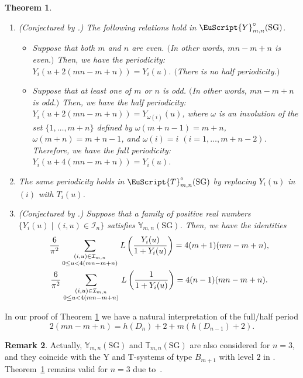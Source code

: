 \documentclass[pdftex]{sigma}
\numberwithin{equation}{section}
\newtheorem{Theorem}{Theorem}[section]
\theoremstyle{definition}
\newtheorem{Remark}[Theorem]{Remark}
\begin{document}
\begin{Theorem}\label{thm:Yperiodm}\qquad
\begin{enumerate}\itemsep=0pt
\item[$(i)$] {\rm (Conjectured by \cite{Tateo95}.)}
The following relations hold in $\EuScript{Y}^{\circ}_{m,n}(\mathrm{SG})$.
\begin{itemize}\itemsep=0pt
\item[$(a)$] Suppose that both $m$ and $n$ are even.
$($In other words, $mn-m+n$ is even.$)$
Then, we have the periodicity: $Y_i(u+2(mn-m+n))=Y_i(u)$.
$($There is no half periodicity.$)$
\item[$(b)$] Suppose that at least one of $m$ or $n$ is odd.
$($In other words, $mn-m+n$ is odd.$)$
Then, we have the half periodicity: $Y_i(u+2(mn-m+n))=Y_{\omega(i)}(u)$, where
$\omega$ is an involution of the set $\{1,\dots,m+n\}$
defined by $\omega(m+n-1)=m+n$, $\omega(m+n)=m+n-1$,
and $\omega(i)=i$ $(i=1,\dots,m+n-2)$.
Therefore, we have the full periodicity: $Y_i(u+4(mn-m+n))=Y_i(u)$.
\end{itemize}

\item[$(ii)$]  The same periodicity holds
in  $\EuScript{T}^{\circ}_{m,n}(\mathrm{SG})$
by replacing $Y_i(u)$ in $(i)$ with $T_i(u)$.

\item[$(iii)$] {\rm (Conjectured by \cite{Tateo95}.)}
Suppose that a family of positive real numbers
$\{ Y_i(u) \mid (i,u)\in \mathcal{I}_n\}$ satisfies
$\mathbb{Y}_{m,n}(\mathrm{SG})$.
Then, we have the identities
\begin{gather*}
\frac{6}{\pi^2}
\sum_{
\genfrac{}{}{0pt}{1}
{
(i,u)\in \mathcal{I}_{m,n}
}
{
0\leq u < 4(mn-m+n)
}
}
L\left(
\frac{Y_i(u)}{1+Y_i(u)}
\right)
=4(m+1)(mn-m+n),\\
\frac{6}{\pi^2}
\sum_{
\genfrac{}{}{0pt}{1}
{
(i,u)\in \mathcal{I}_{m,n}
}
{
0\leq u < 4(mn-m+n)
}
}
L\left(
\frac{1}{1+Y_i(u)}
\right)
=4(n-1)(mn-m+n).
\end{gather*}
\end{enumerate}
\end{Theorem}



In our proof of Theorem \ref{thm:Yperiodm}
we have  a natural interpretation
of the  full/half period
\[
2(mn-m+n)=h(D_n)+2+ m(h(D_{n-1})+2).
\]

\begin{Remark}
Actually,
 $\mathbb{Y}_{m,n}(\mathrm{SG})$ and  $\mathbb{T}_{m,n}(\mathrm{SG})$
are also considered for $n=3$,
and they coincide with the Y and T-systems of
type $B_{m+1}$ with level $2$ in \cite{Kuniba94a}.
Theorem~\ref{thm:Yperiodm} remains valid for $n=3$ due to~\cite{Inoue10a}.
\end{Remark}
\end{document}

